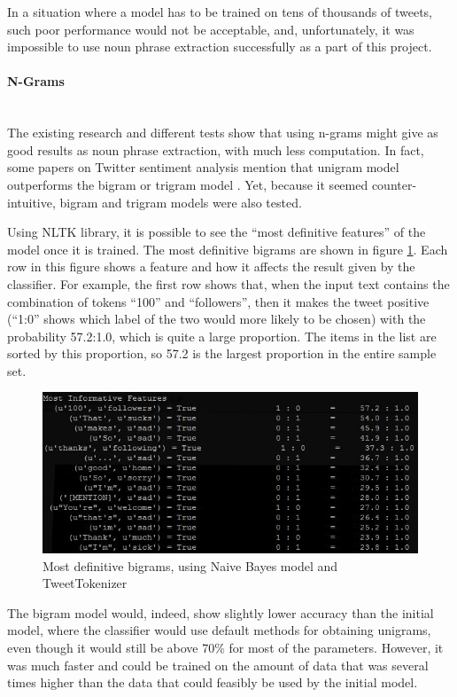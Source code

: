In a situation where a model has to be trained on tens of thousands of tweets, such poor performance would not be acceptable, and, unfortunately, it was impossible to use noun phrase extraction successfully as a part of this project. 

\paragraph{N-Grams}\mbox{}\\
The existing research and different tests show that using n-grams might give as good results as noun phrase extraction, with much less computation. In fact, some papers on Twitter sentiment analysis mention that unigram model outperforms the bigram or trigram model \cite{agarwal2011sentiment}. Yet, because it seemed counter-intuitive, bigram and trigram models were also tested.

Using NLTK library, it is possible to see the ``most definitive features'' of the model once it is trained. The most definitive bigrams are shown in figure \ref{fig:bigrams}. Each row in this figure shows a feature and how it affects the result given by the classifier. For example, the first row shows that, when the input text contains the combination of tokens ``100'' and  ``followers'', then it makes the tweet positive (``1:0'' shows which label of the two would more likely to be chosen) with the probability 57.2:1.0, which is quite a large proportion. The items in the list are sorted by this proportion, so 57.2 is the largest proportion in the entire sample set.

\begin{figure}
    \centering
    \includegraphics[width=\textwidth]{most_definitive_bigrams}
    \caption{Most definitive bigrams, using Naive Bayes model and TweetTokenizer}
    \label{fig:bigrams}
\end{figure}

The bigram model would, indeed, show slightly lower accuracy than the initial model, where the classifier would use default methods for obtaining unigrams, even though it would still be above 70\% for most of the parameters. However, it was much faster and could be trained on the amount of data that was several times higher than the data that could feasibly be used by the initial model. 

